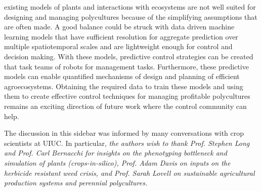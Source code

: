  existing models of plants and interactions with ecosystems \cite{Stehfest2007a,Foley1996a, Kucharik2003a,Friedl2010a, Rodrigues2010a, Nunes2013a} are not well suited for designing and managing polycultures because of the simplifying assumptions that are often made. A good balance could be struck with data driven machine learning models that have sufficient resolution for aggregate prediction over multiple spatiotemporal scales and are lightweight enough for control and decision making. With these models, predictive control strategies can be created that task teams of robots for management tasks. Furthermore, these predictive models can enable quantified mechanisms of design and planning of efficient agroecosystems. %
 Obtaining the required data to train these models and using them to create effective control techniques for managing profitable polycultures remains an exciting direction of future work where the control community can help.
 
 The discussion in this sidebar was informed by many conversations with  crop scientists at UIUC. In particular, 
\textit{the authors wish to thank Prof. Stephen Long and Prof. Carl Bernacchi for insights on the phenotyping bottleneck and simulation of plants (\textit{crops-in-silico}), Prof. Adam Davis on inputs on the herbicide resistant weed crisis, and Prof. Sarah Lovell on sustainable agricultural production systems and perennial polycultures.} 

